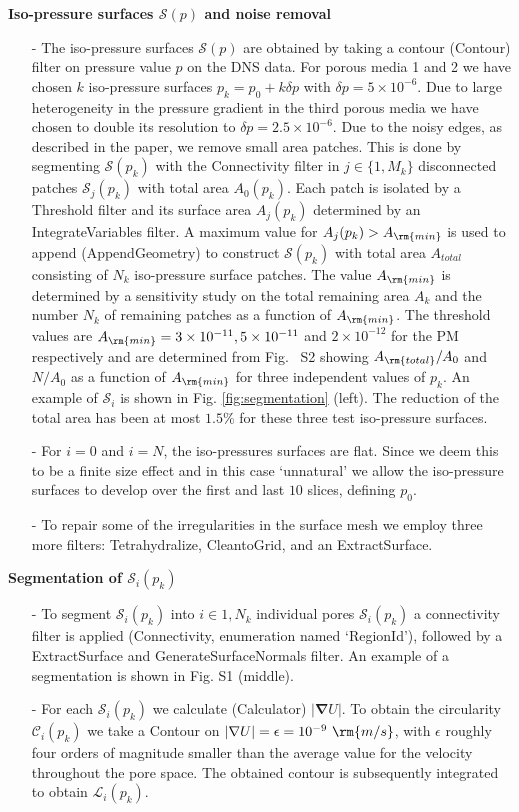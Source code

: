 \documentclass[draft,jgrga]{agutexSI2019}
\begin{document}
\begin{article}
\noindent\textbf{Iso-pressure surfaces $\mathcal{S}(p)$ and noise removal}
\begin{itemize}
	\item[-]The iso-pressure surfaces $\mathcal{S}(p)$ are obtained by taking a contour (Contour) filter on pressure value $p$ on the DNS data. For porous media 1 and 2 we have chosen $k$ iso-pressure surfaces $p_k = p_0+ k \delta p$ with $ \delta p= 5\times 10^{-6}$. Due to large heterogeneity in the pressure gradient in the third porous media we have chosen to double its resolution to $\delta p = 2.5\times 10^{-6}$. Due to the noisy edges, as described in the paper, we remove small area patches. This is done by segmenting $\mathcal{S}(p_k)$ with the Connectivity filter in $j\in \{1,M_k\}$ disconnected patches $\mathcal{S}_j(p_k)$ with total area $A_0(p_k)$. Each patch is isolated by a Threshold filter and its surface area $A_j(p_k)$ determined by an IntegrateVariables filter. A maximum value for $A_j(p_k)> A_{\rm{min}}$ is used to append (AppendGeometry) to construct $\mathcal{S}(p_k)$ with total area $A_{total}$ consisting of $N_k$ iso-pressure surface patches. The value  $A_{\rm{min}}$ is determined by a sensitivity study on the total remaining area $A_k$ and the number $N_k$ of remaining patches as a function of $ A_{\rm{min}}$. The threshold values are $A_{\rm{min}} = 3\times10^{-11}, 5\times10^{-11} $ and $2\times10^{-12}$ for the PM respectively and are determined from Fig.~ S2 showing $A_{\rm{total}}/A_0$ and $N/A_0$ as a function of $A_{\rm{min}}$ for three independent values of $p_k$. An example of $\mathcal{S}_i$ is shown in Fig. \ref{fig:segmentation} (left). The reduction of the total area has been at most $1.5\%$ for these three test iso-pressure surfaces.
	\item[-]For $i=0$ and $i=N$, the iso-pressures surfaces are flat. Since we deem this to be a finite size effect and in this case `unnatural' we allow the iso-pressure surfaces to develop over the first and last $10$ slices, defining $p_0$.
	\item[-]To repair some of the irregularities in the surface mesh we employ three more filters: Tetrahydralize, CleantoGrid, and an ExtractSurface.
\end{itemize}
\noindent\textbf{Segmentation of $\mathcal{S}_i(p_k)$}
\begin{itemize} 
	\item[-]To segment $\mathcal{S}_i(p_k)$ into $i\in{1,N_k}$ individual pores $\mathcal{S}_i(p_k)$ a connectivity filter is applied (Connectivity, enumeration named `RegionId'), followed by a ExtractSurface and GenerateSurfaceNormals filter. An example of a segmentation is shown in Fig. S1 (middle).
	\item[-] For each $\mathcal{S}_i(p_k)$ we calculate (Calculator) $\left|\mathbf{\nabla}U\right|$. To obtain the circularity $\mathcal{C}_i(p_k)$ we take a Contour on $\left|\mathbf{\nabla}U\right|=\epsilon = 10^{-9}~\rm{m/s}$, with $\epsilon$ roughly four orders of magnitude smaller than the average value for the velocity throughout the pore space. The obtained contour is subsequently integrated to obtain $\mathcal{L}_i(p_k)$. 


\end{itemize}
\end{article}
\end{document}
